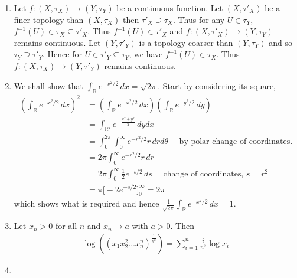 \documentclass[a4paper,12pt]{article}
\theoremstyle{definition}
\begin{document}
\begin{enumerate}
\item Let $f : (X, \tau_X) \to (Y, \tau_Y)$ be a continuous function. Let $(X,\tau'_X)$ be a finer topology than $(X, \tau_X)$ then $\tau'_X \supseteq \tau_X$. Thus for any $U \in \tau_Y$, $f^{-1}(U) \in \tau_X \subseteq \tau'_X$. Thus $f^{-1}(U) \in \tau'_X$ and $f : (X, \tau'_X) \to (Y, \tau_Y)$ remains continuous. Let $(Y,\tau'_Y)$ is a topology coarser than $(Y, \tau_Y)$ and so $\tau_Y \supseteq\tau'_Y$. Hence for $U \in \tau'_Y \subseteq \tau_Y$, we have $f^{-1}(U)\in \tau_X$. Thus  $f : (X, \tau_X) \to (Y, \tau'_Y)$ remains continuous.

\item We shall show that $\int_{\mathbb{R}}e^{-x^2/2}\,dx = \sqrt{2\pi}$. Start by considering its square,
\begin{align*}
\left(\int_{\mathbb{R}}e^{-x^2/2}\,dx\right)^2 &= \left(\int_{\mathbb{R}}e^{-x^2/2}\,dx\right)\left(\int_{\mathbb{R}}e^{-y^2/2}\,dy\right)\\
&=\int_{\mathbb{R}^2}e^{-\frac{x^2+y^2}{2}}\,dydx\\
& = \int_{0}^{2\pi}\int_{0}^{\infty}e^{-r^2/2}r \,drd\theta \quad\text{   by polar change of coordinates.}\\
&= 2\pi \int_{0}^{\infty}e^{-r^2/2}r \,dr \\
&=2\pi \int_{0}^{\infty}\frac{1}{2}e^{-s/2} \,ds\quad \text{ change of coordinates, $s = r^2$}\\
&=\pi \Big[-2e^{-s/2}\Big]_{0}^{\infty} = 2\pi
\end{align*}
which shows what is required and hence $\frac{1}{\sqrt{2\pi}}\int_{\mathbb{R}}e^{-x^2/2}\,dx=1$.
\item Let $x_n >0$ for all $n$ and $x_n \to a$ with $a >0$. Then
\begin{align*}
\log \left((x_1x_2^2 \ldots x_n^n)^{\frac{1}{n^2}}\right) = \sum_{i=1}^{n}\frac{i}{n^2}\log x_i
\end{align*}

\item
\end{enumerate}
\end{document}
